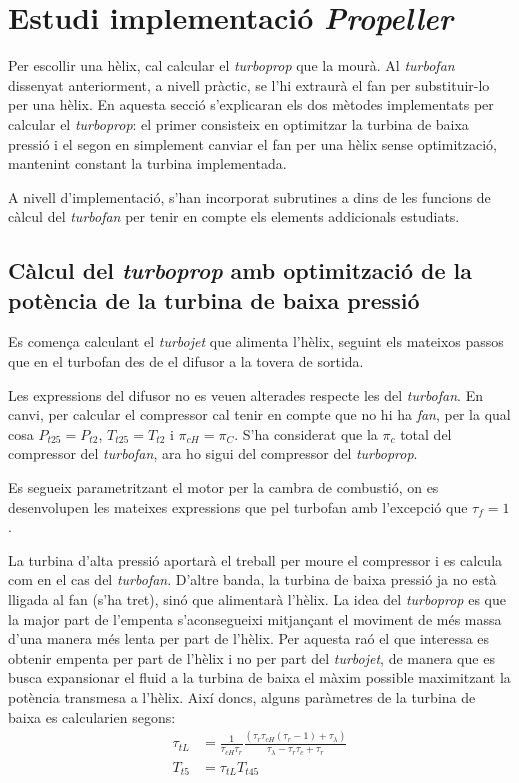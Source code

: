 \section{Estudi implementació \textit{Propeller}}
Per escollir una hèlix, cal calcular el \textit{ turboprop} que la mourà. Al \textit{turbofan} dissenyat anteriorment, a nivell pràctic, se l'hi extraurà el fan per substituir-lo per una hèlix. En aquesta secció s'explicaran els dos mètodes implementats per calcular el \textit{turboprop}: el primer consisteix en optimitzar la turbina de baixa pressió i el segon en simplement canviar el fan per una hèlix sense optimització, mantenint constant la turbina implementada.

\noindent A nivell d'implementació, s'han incorporat subrutines a dins de les funcions de càlcul del \textit{turbofan} per tenir en compte els elements addicionals estudiats. 
\subsection{Càlcul del \textit{turboprop} amb optimització de la potència de la turbina de baixa pressió}
Es comença calculant el \textit{turbojet} que alimenta l'hèlix, seguint els mateixos passos que en el turbofan des de el difusor a la tovera de sortida.

\noindent Les expressions del difusor no es veuen alterades respecte les del \textit{turbofan}. En canvi, per calcular el compressor cal tenir en compte que no hi ha \textit{fan}, per la qual cosa $P_{t25}=P_{t2}$, $T_{t25}=T_{t2}$ i $\pi_{cH}=\pi_{C}$. S'ha considerat que la $\pi_c$ total del compressor del \textit{turbofan}, ara ho sigui del compressor del \textit{turboprop}.

\noindent Es segueix parametritzant el motor per la cambra de combustió, on es desenvolupen les mateixes expressions que pel turbofan amb l'excepció que $\tau_f=1$.

\noindent La turbina d'alta pressió aportarà el treball per moure el compressor i es calcula com en el cas del \textit{turbofan}. D'altre banda, la turbina de baixa pressió ja no està lligada al fan (s'ha tret), sinó que alimentarà l'hèlix. La idea del \textit{turboprop} es que la major part de l'empenta s'aconsegueixi mitjançant el moviment de més massa d'una manera més lenta per part de l'hèlix. Per aquesta raó el que interessa es obtenir empenta per part de l'hèlix i no per part del \textit{turbojet}, de manera que es busca expansionar el fluid a la turbina de baixa el màxim possible maximitzant la potència transmesa a l'hèlix. 
\noindent Així doncs, alguns paràmetres de la turbina de baixa es calcularien segons:
\begin{align}
	\tau_{tL}&=\frac{1}{\tau_{cH}\tau_r}\frac{(\tau_r\tau_{cH}(\tau_r-1)+\tau_\lambda)}{\tau_\lambda-\tau_r\tau_{c}+\tau_r}\label{turboprop_turbopt}\\
	T_{t5}&=\tau_{tL}T_{t45}
\end{align}


